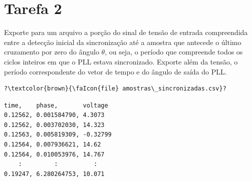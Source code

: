 \section*{Tarefa 2}
Exporte para um arquivo  a porção do sinal de tensão de entrada compreendida entre a detecção
inicial da sincronização até a amostra que antecede o último cruzamento por zero do ângulo $\theta$, ou seja, o período
que compreende todos os ciclos inteiros em que o PLL estava sincronizado.
Exporte além da tensão, o período correspondente do vetor de tempo e do ângulo de saída do PLL.


\pagebreak
{}

\begin{verbatim}
?\textcolor{brown}{\faIcon{file} amostras\_sincronizadas.csv}?
\end{verbatim}
\vspace{-0.8em}
\begin{verbatim}
time,    phase,       voltage
0.12562, 0.001584790, 4.3073
0.12562, 0.003702030, 14.323
0.12563, 0.005819309, -0.32799
0.12564, 0.007936621, 14.62
0.12564, 0.010053976, 14.767
    :         :          :
0.19247, 6.280264753, 10.071
\end{verbatim}



